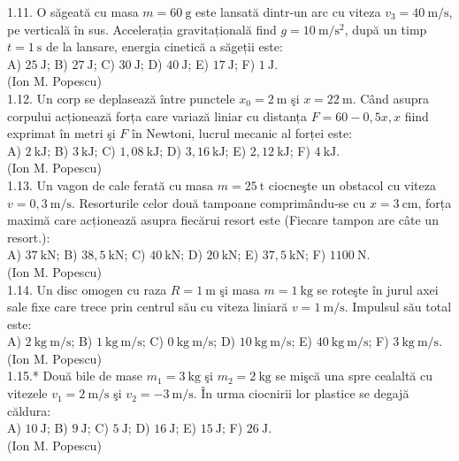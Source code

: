 1.11. O săgeată cu masa $m=60 \mathrm{~g}$ este lansată dintr-un arc cu viteza $v_{3}=40 \mathrm{~m} / \mathrm{s}$, pe verticală în sus. Accelerația gravitațională find $g=10 \mathrm{~m} / \mathrm{s}^{2}$, după un timp $t=1 \mathrm{~s}$ de la lansare, energia cinetică a săgeții este:\\ A) $25 \mathrm{~J}$; B) $27 \mathrm{~J}$; C) $30 \mathrm{~J}$; D) $40 \mathrm{~J}$; E) $17 \mathrm{~J}$; F) $1 \mathrm{~J}$.\\ (Ion M. Popescu)\\

1.12. Un corp se deplasează între punctele $x_{0}=2 \mathrm{~m}$ şi $x=22 \mathrm{~m}$. Când asupra corpului acționează forța care variază liniar cu distanța $F=60-0,5 x, x$ fiind exprimat în metri şi $F$ în Newtoni, lucrul mecanic al forței este:\\ A) $2 \mathrm{~kJ}$; B) $3 \mathrm{~kJ}$; C) $1,08 \mathrm{~kJ}$; D) $3,16 \mathrm{~kJ}$; E) $2,12 \mathrm{~kJ}$; F) $4 \mathrm{~kJ}$.\\ (Ion M. Popescu)\\

1.13. Un vagon de cale ferată cu masa $m=25 \mathrm{~t}$ ciocneşte un obstacol cu viteza $v=0,3 \mathrm{~m} / \mathrm{s}$. Resorturile celor două tampoane comprimându-se cu $x=3 \mathrm{~cm}$, forța maximă care acționează asupra fiecărui resort este (Fiecare tampon are câte un resort.):\\ A) $37 \mathrm{~kN}$; B) $38,5 \mathrm{~kN}$; C) $40 \mathrm{~kN}$; D) $20 \mathrm{~kN}$; E) $37,5 \mathrm{~kN}$; F) $1100 \mathrm{~N}$.\\ (Ion M. Popescu)\\

1.14. Un disc omogen cu raza $R=1 \mathrm{~m}$ şi masa $m=1 \mathrm{~kg}$ se roteşte în jurul axei sale fixe care trece prin centrul său cu viteza liniară $v=1 \mathrm{~m} / \mathrm{s}$. Impulsul său total este:\\ A) $2 \mathrm{~kg} \mathrm{~m} / \mathrm{s}$; B) $1 \mathrm{~kg} \mathrm{~m} / \mathrm{s}$; C) $0 \mathrm{~kg} \mathrm{~m} / \mathrm{s}$; D) $10 \mathrm{~kg} \mathrm{~m} / \mathrm{s}$; E) $40 \mathrm{~kg} \mathrm{~m} / \mathrm{s}$; F) $3 \mathrm{~kg} \mathrm{~m} / \mathrm{s}$.\\ (Ion M. Popescu)\\

1.15.* Două bile de mase $m_{1}=3 \mathrm{~kg}$ şi $m_{2}=2 \mathrm{~kg}$ se mişcă una spre cealaltă cu vitezele $v_{1}=2 \mathrm{~m} / \mathrm{s}$ şi $v_{2}=-3 \mathrm{~m} / \mathrm{s}$. În urma ciocnirii lor plastice se degajă căldura:\\ A) $10 \mathrm{~J}$; B) $9 \mathrm{~J}$; C) $5 \mathrm{~J}$; D) $16 \mathrm{~J}$; E) $15 \mathrm{~J}$; F) $26 \mathrm{~J}$.\\ (Ion M. Popescu)\\

